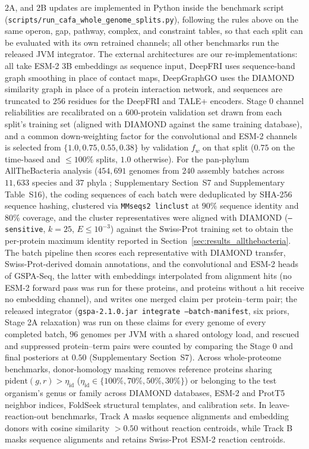 \documentclass[10pt,twocolumn]{article}
\begin{document}
2A, and 2B updates are implemented in Python inside the benchmark script (\texttt{scripts/run\_cafa\_whole\_genome\_splits.py}), following the rules above on the same operon, gap, pathway, complex, and constraint tables, so that each split can be evaluated with its own retrained channels; all other benchmarks run the released JVM integrator. The external architectures are our re-implementations: all take ESM-2 3B embeddings as sequence input, DeepFRI uses sequence-band graph smoothing in place of contact maps, DeepGraphGO uses the DIAMOND similarity graph in place of a protein interaction network, and sequences are truncated to $256$ residues for the DeepFRI and TALE+ encoders. Stage 0 channel reliabilities are recalibrated on a $600$-protein validation set drawn from each split's training set (aligned with DIAMOND against the same training database), and a common down-weighting factor for the convolutional and ESM-2 channels is selected from $\{1.0, 0.75, 0.55, 0.38\}$ by validation $f_w$ on that split ($0.75$ on the time-based and $\le 100\%$ splits, $1.0$ otherwise). For the pan-phylum AllTheBacteria analysis ($454{,}691$ genomes from $240$ assembly batches across $11{,}633$ species and $37$ phyla \citep{hunt2024allthebacteria}; Supplementary Section~S7 and Supplementary Table~S16), the coding sequences of each batch were deduplicated by SHA-256 sequence hashing, clustered via \texttt{MMseqs2 linclust} \citep{steinegger2018clustering} at $90\%$ sequence identity and $80\%$ coverage, and the cluster representatives were aligned with DIAMOND (\texttt{--sensitive}, $k = 25$, $E \le 10^{-3}$) against the Swiss-Prot training set to obtain the per-protein maximum identity reported in Section~\ref{sec:results_allthebacteria}. The batch pipeline then scores each representative with DIAMOND transfer, Swiss-Prot-derived domain annotations, and the convolutional and ESM-2 heads of GSPA-Seq, the latter with embeddings interpolated from alignment hits (no ESM-2 forward pass was run for these proteins, and proteins without a hit receive no embedding channel), and writes one merged claim per protein--term pair; the released integrator (\texttt{gspa-2.1.0.jar integrate --batch-manifest}, six priors, Stage 2A relaxation) was run on these claims for every genome of every completed batch, $96$ genomes per JVM with a shared ontology load, and rescued and suppressed protein--term pairs were counted by comparing the Stage 0 and final posteriors at $0.50$ (Supplementary Section~S7). Across whole-proteome benchmarks, donor-homology masking removes reference proteins sharing $\text{pident}(g, r) > \eta_{\text{id}}$ ($\eta_{\text{id}} \in \{100\%, 70\%, 50\%, 30\%\}$) or belonging to the test organism's genus or family across DIAMOND databases, ESM-2 and ProtT5 neighbor indices, FoldSeek structural templates, and calibration sets. In leave-reaction-out benchmarks, Track A masks sequence alignments and embedding donors with cosine similarity $> 0.50$ without reaction centroids, while Track B masks sequence alignments and retains Swiss-Prot ESM-2 reaction centroids.
\end{document}
